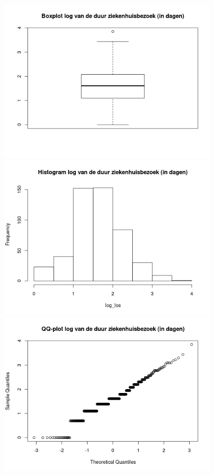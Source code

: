 \documentclass{article}
\begin{document}
\begin{figure}[!htb]
  \includegraphics[width=\linewidth]{output/boxplot-loglos.png}
\endminipage\hfill
{}
  \includegraphics[width=\linewidth]{output/histogram-loglos.png}
\endminipage\hfill
{}%
  \includegraphics[width=\linewidth]{output/qqplot-loglos.png}
\endminipage
\end{figure}
\end{document}
